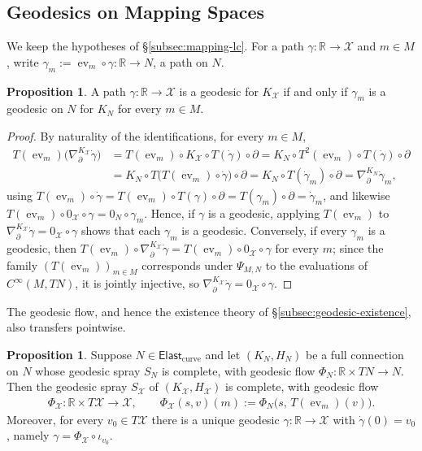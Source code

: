 \documentclass{amsart}
\newcommand{\R}{\mathbb{R}}
\newcommand{\X}{\mathcal{X}}
\DeclareMathOperator{\evl}{ev}
\theoremstyle{definition}
\newtheorem{prop}[thm]{Proposition}
\begin{document}
\subsection{Geodesics on Mapping Spaces}\label{subsec:mapping-geodesics}

We keep the hypotheses of \S\ref{subsec:mapping-lc}. For a path
$\gamma \colon \R \to \X$ and $m \in M$, write
$\gamma_m := \evl_m \circ \gamma \colon \R \to N$, a path on $N$.

\begin{prop}\label{prop:mapping-space-geodesic}
  A path $\gamma \colon \R \to \X$ is a geodesic for $K_{\X}$ if and only if
  $\gamma_m$ is a geodesic on $N$ for $K_N$ for every $m \in M$.
\end{prop}

\begin{proof}
  By naturality of the identifications, for every $m \in M$,
  \begin{align*}
    T(\evl_m)\bigl(\nabla^{K_{\X}}_\partial \dot\gamma\bigr)
      &= T(\evl_m) \circ K_{\X} \circ T(\dot\gamma) \circ \partial
       = K_N \circ T^2(\evl_m) \circ T(\dot\gamma) \circ \partial \\
      &= K_N \circ T\bigl(T(\evl_m) \circ \dot\gamma\bigr) \circ \partial
       = K_N \circ T(\dot\gamma_m) \circ \partial
       = \nabla^{K_N}_\partial \dot\gamma_m,
  \end{align*}
  using $T(\evl_m) \circ \dot\gamma
  = T(\evl_m) \circ T(\gamma) \circ \partial = T(\gamma_m) \circ \partial
  = \dot\gamma_m$, and likewise
  $T(\evl_m) \circ 0_{\X} \circ \gamma = 0_N \circ \gamma_m$.
  Hence, if $\gamma$ is a geodesic, applying $T(\evl_m)$ to
  $\nabla^{K_{\X}}_\partial \dot\gamma = 0_{\X} \circ \gamma$ shows that each
  $\gamma_m$ is a geodesic. Conversely, if every $\gamma_m$ is a geodesic,
  then $T(\evl_m) \circ \nabla^{K_{\X}}_\partial \dot\gamma
  = T(\evl_m) \circ 0_{\X} \circ \gamma$ for every $m$; since the family
  $(T(\evl_m))_{m \in M}$ corresponds under $\Psi_{M,N}$ to the evaluations of
  $C^\infty(M, TN)$, it is jointly injective, so
  $\nabla^{K_{\X}}_\partial \dot\gamma = 0_{\X} \circ \gamma$.
\end{proof}

The geodesic flow, and hence the existence theory of
\S\ref{subsec:geodesic-existence}, also transfers pointwise.

\begin{prop}\label{prop:mapping-space-flow}
  Suppose $N \in \mathsf{Elast}_{\mathrm{curve}}$ and let $(K_N, H_N)$ be a full
  connection on $N$ whose geodesic spray $S_N$ is complete, with geodesic flow
  $\Phi_N \colon \R \times TN \to N$. Then the geodesic spray $S_{\X}$ of
  $(K_{\X}, H_{\X})$ is complete, with geodesic flow
  \begin{align*}
    \Phi_{\X} \colon \R \times T\X \to \X,
    \qquad
    \Phi_{\X}(s, v)(m) := \Phi_N\bigl(s,\, T(\evl_m)(v)\bigr).
  \end{align*}
  Moreover, for every $v_0 \in T\X$ there is a unique geodesic
  $\gamma \colon \R \to \X$ with $\dot\gamma(0) = v_0$, namely
  $\gamma = \Phi_{\X} \circ \iota_{v_0}$.
\end{prop}
\end{document}

